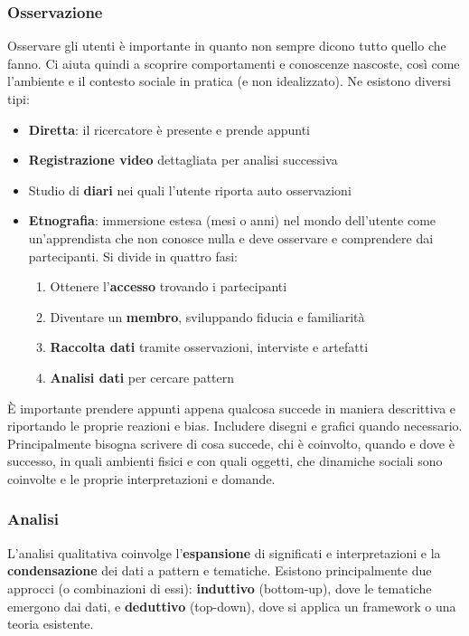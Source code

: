 \subsubsection{Osservazione}
Osservare gli utenti è importante in quanto non sempre dicono tutto quello che fanno. Ci aiuta quindi a scoprire comportamenti e conoscenze nascoste, così come l'ambiente e il contesto sociale in pratica (e non idealizzato). Ne esistono diversi tipi:
\begin{itemize}
	\item \textbf{Diretta}: il ricercatore è presente e prende appunti
	\item \textbf{Registrazione video} dettagliata per analisi successiva
	\item Studio di \textbf{diari} nei quali l'utente riporta auto osservazioni
	\item \textbf{Etnografia}: immersione estesa (mesi o anni) nel mondo dell'utente come un'apprendista che non conosce nulla e deve osservare e comprendere dai partecipanti. Si divide in quattro fasi:
	\begin{enumerate}
		\item Ottenere l'\textbf{accesso} trovando i partecipanti
		\item Diventare un \textbf{membro}, sviluppando fiducia e familiarità
		\item \textbf{Raccolta dati} tramite osservazioni, interviste e artefatti
		\item \textbf{Analisi dati} per cercare pattern
	\end{enumerate}
\end{itemize}

\begin{observation}[Appunti]
	È importante prendere appunti appena qualcosa succede in maniera descrittiva e riportando le proprie reazioni e bias. Includere disegni e grafici quando necessario. Principalmente bisogna scrivere di cosa succede, chi è coinvolto, quando e dove è successo, in quali ambienti fisici e con quali oggetti, che dinamiche sociali sono coinvolte e le proprie interpretazioni e domande.
\end{observation}

\subsubsection{Analisi}
L'analisi qualitativa coinvolge l'\textbf{espansione} di significati e interpretazioni e la \textbf{condensazione} dei dati a pattern e tematiche. Esistono principalmente due approcci (o combinazioni di essi): \textbf{induttivo} (bottom-up), dove le tematiche emergono dai dati, e \textbf{deduttivo} (top-down), dove si applica un framework o una teoria esistente.\\

